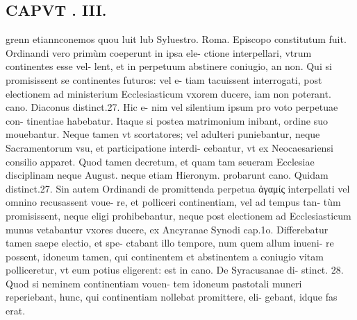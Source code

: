 \documentclass{article}
\begin{document}
\begin{pages}
\section*{CAPVT . III. }
\marginpar{[ p.113 ]}\pstart grenn etiannconemos quou luit lub Syluestro. Roma. Episcopo constitutum fuit.  \pend\pstart Ordinandi vero primùm coeperunt in ipsa ele- ctione interpellari, vtrum continentes esse vel- lent, et in perpetuum abstinere coniugio, an non. Qui si promisissent se continentes futuros: vel e- tiam tacuissent interrogati, post electionem ad ministerium Ecclesiasticum vxorem ducere, iam non poterant. cano. Diaconus distinct.27. Hic e- nim vel silentium ipsum pro voto perpetuae con- tinentiae habebatur. Itaque  si postea matrimonium inibant, ordine suo mouebantur. Neque tamen vt scortatores; vel adulteri puniebantur, neque Sacramentorum vsu, et participatione interdi- cebantur, vt ex Neocaesariensi consilio apparet. Quod tamen decretum, et quam tam seueram Ecclesiae disciplinam neque August. neque etiam Hieronym. probarunt cano. Quidam distinct.27. Sin autem Ordinandi de promittenda perpetua ἀγαμίς interpellati vel omnino recusassent voue- re, et polliceri continentiam, vel ad tempus tan- tùm promisissent, neque eligi prohibebantur, neque post electionem ad Ecclesiasticum munus vetabantur vxores ducere, ex Ancyranae Synodi cap.1o. Differebatur tamen saepe electio, et spe- ctabant illo tempore, num quem allum inueni- re possent, idoneum tamen, qui continentem et abstinentem a coniugio vitam polliceretur, vt eum potius eligerent: est in cano. De Syracusanae di- stinct. 28. Quod si neminem continentiam vouen- tem idoneum pastotali muneri reperiebant, hunc, qui continentiam nollebat promittere, eli- gebant, idque fas erat.  \pend

\end{pages}
\end{document}
